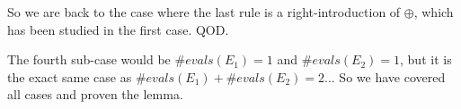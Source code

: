 \documentclass[a4paper,12pt,twoside]{article}
\begin{document}

So we are back to the case where the last rule is a right-introduction
of $\oplus$, which has been studied in the first case. QOD.

The fourth sub-case would be $\#evals(E_1) = 1$ and $\#evals(E_2) = 1$,
but it is the exact same case as $\#evals(E_1) + \#evals(E_2) = 2$... So
we have covered all cases and proven the lemma.


\newpage


\end{document}
